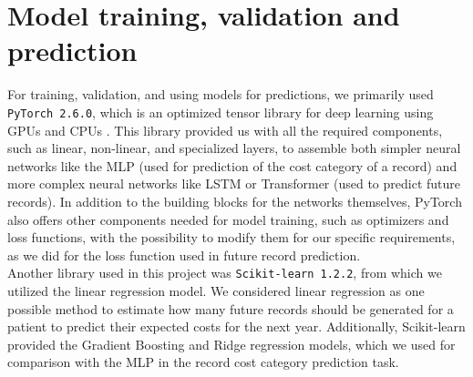 \newpage

\section{Model training, validation and prediction}
\label{modelDesign}

For training, validation, and using models for predictions, we primarily used \texttt{PyTorch 2.6.0}, which is an optimized tensor library for deep learning using GPUs and CPUs \cite{pytorch}. This library provided us with all the required components, such as linear, non-linear, and specialized layers, to assemble both simpler neural networks like the MLP (used for prediction of the cost category of a record) and more complex neural networks like LSTM or Transformer (used to predict future records). In addition to the building blocks for the networks themselves, PyTorch also offers other components needed for model training, such as optimizers and loss functions, with the possibility to modify them for our specific requirements, as we did for the loss function used in future record prediction.
\\

Another library used in this project was \texttt{Scikit-learn 1.2.2}, from which we utilized the linear regression model. We considered linear regression as one possible method to estimate how many future records should be generated for a patient to predict their expected costs for the next year. Additionally, Scikit-learn provided the Gradient Boosting and Ridge regression models, which we used for comparison with the MLP in the record cost category prediction task.